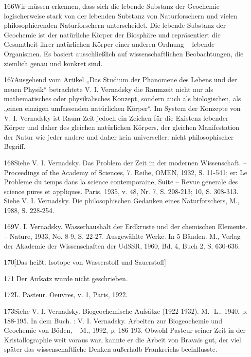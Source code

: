 \documentclass[11pt,a4paper]{book}
\begin{document}
166Wir müssen erkennen, dass sich die lebende Substanz der Geochemie logischerweise stark von der lebenden Substanz von Naturforschern und vielen philosophierenden Naturforschern unterscheidet. Die lebende Substanz der Geochemie ist der natürliche Körper der Biosphäre und repräsentiert die Gesamtheit ihrer natürlichen Körper einer anderen Ordnung -- lebende Organismen. Es basiert ausschließlich auf wissenschaftlichen Beobachtungen, die ziemlich genau und konkret sind.



167Ausgehend vom Artikel „Das Studium der Phänomene des Lebens und der neuen Physik“ betrachtete V. I. Vernadsky die Raumzeit nicht nur als mathematisches oder physikalisches Konzept, sondern auch als biologischen, als „einen einzigen umfassenden natürlichen Körper“. Im System der Konzepte von V. I. Vernadsky ist Raum-Zeit jedoch ein Zeichen für die Existenz lebender Körper und daher des gleichen natürlichen Körpers, der gleichen Manifestation der Natur wie jeder andere und daher kein universeller, nicht philosophischer Begriff.



168Siehe V. I. Vernadsky. Das Problem der Zeit in der modernen Wissenschaft. -- Proceedings of the Academy of Sciences, 7. Reihe, OMEN, 1932, S. 11-541; er: Le Probleme du temps dans la science contemporaine, Suite -- Revue generale des science pures et appliques. Paris, 1935, v. 48, Nr. 7, S. 208-213; 10, S. 308-313. Siehe V. I. Vernadsky. Die philosophischen Gedanken eines Naturforschers, M., 1988, S. 228-254.



169V. I. Vernadsky. Wasserhaushalt der Erdkruste und der chemischen Elemente. -- Nature, 1933, No. 8-9, S. 22-27. Ausgewählte Werke. In 5 Bänden. M., Verlag der Akademie der Wissenschaften der UdSSR, 1960, Bd. 4, Buch 2, S. 630-636.



170[Das heißt. Isotope von Wasserstoff und Sauerstoff]



171 Der Aufsatz wurde nicht geschrieben.



172L. Pasteur. Oeuvres, v. 1, Paris, 1922.



173Siehe V. I. Vernadsky. Biogeochemische Aufsätze (1922-1932). M. -L., 1940, p. 188-195. In dem Buch. : V. I. Vernadsky. Arbeiten zur Biogeochemie und Geochemie von Böden, -- M., 1992, p. 186-193. Obwohl Pasteur seiner Zeit in der Kristallographie weit voraus war, kannte er die Arbeit von Bravais gut, der viel später das wissenschaftliche Denken außerhalb Frankreichs beeinflusste.
\end{document}
